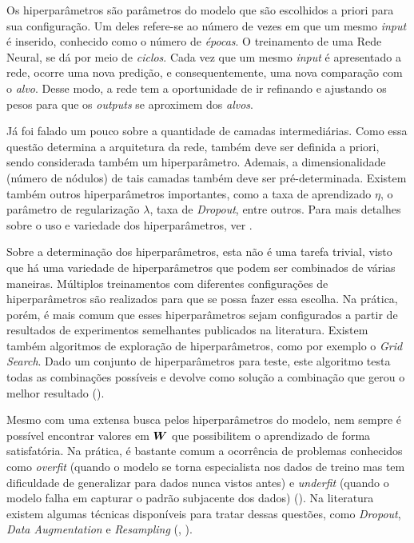 Os hiperparâmetros são parâmetros do modelo que são escolhidos a priori para sua configuração. Um deles refere-se ao número de vezes em que um mesmo \textit{input} é inserido, conhecido como o número de \textit{épocas}. O treinamento de uma Rede Neural, se dá por meio de \textit{ciclos}. Cada vez que um mesmo \textit{input} é apresentado a rede, ocorre uma nova predição, e consequentemente, uma nova comparação com o \textit{alvo}. Desse modo, a rede tem a oportunidade de ir refinando e ajustando os pesos para que os \textit{outputs} se aproximem dos \textit{alvos}.

Já foi falado um pouco sobre a quantidade de camadas intermediárias. Como essa questão determina a arquitetura da rede, também deve ser definida a priori, sendo considerada também um hiperparâmetro. Ademais, a dimensionalidade (número de nódulos) de tais camadas também deve ser pré-determinada. Existem também outros hiperparâmetros importantes, como a taxa de aprendizado $\eta$, o parâmetro de regularização $\lambda$, taxa de \textit{Dropout}, entre outros. Para mais detalhes sobre o uso e variedade dos hiperparâmetros, ver \cite{josh:2017}. 

Sobre a determinação dos hiperparâmetros, esta não é uma tarefa trivial, visto que há uma variedade de hiperparâmetros que podem ser combinados de várias maneiras. Múltiplos treinamentos com diferentes configurações de hiperparâmetros são realizados para que se possa fazer essa escolha. Na prática, porém, é mais comum que esses hiperparâmetros sejam configurados a partir de resultados de experimentos semelhantes publicados na literatura. Existem também algoritmos de exploração de hiperparâmetros, como por exemplo o \textit{Grid Search}. Dado um conjunto de hiperparâmetros para teste, este algoritmo testa todas as combinações possíveis e devolve como solução a combinação que gerou o melhor resultado (\cite{Goodfellow-et-al-2016}).

Mesmo com uma extensa busca pelos hiperparâmetros do modelo, nem sempre é possível encontrar valores em $\bm{W}$ que possibilitem o aprendizado de forma satisfatória. Na prática, é bastante comum a ocorrência de problemas conhecidos como \textit{overfit} (quando o modelo se torna especialista nos dados de treino mas tem dificuldade de generalizar para dados nunca vistos antes) e \textit{underfit} (quando o modelo falha em capturar o padrão subjacente dos dados) (\cite{josh:2017}). Na literatura existem algumas técnicas disponíveis para tratar dessas questões, como \textit{Dropout}, \textit{Data Augmentation} e \textit{Resampling} (\cite{Goodfellow-et-al-2016}, \cite{josh:2017}).  %

